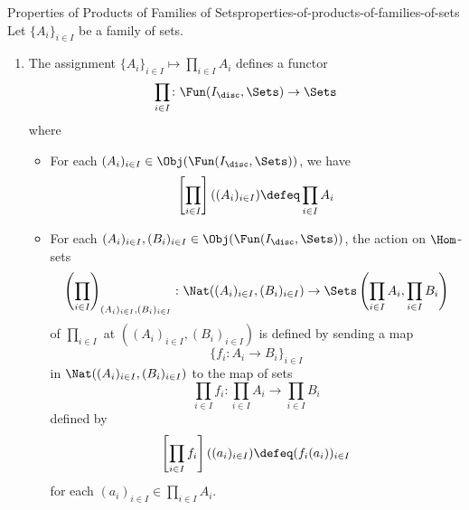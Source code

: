 \begin{proposition}{Properties of Products of Families of Sets}{properties-of-products-of-families-of-sets}%
    Let $\{A_{i}\}_{i\in I}$ be a family of sets.%
    \begin{enumerate}
        \item\label{properties-of-products-of-families-of-sets-functoriality}The assignment $\{A_{i}\}_{i\in I}\mapsto\prod_{i\in I}A_{i}$ defines a functor
            \[
                \prod_{i\in I}%
                \colon%
                \Fun(I_{\disc},\Sets)%
                \to%
                \Sets%
            \]%
            where
            \begin{itemize}
                \item{}For each $(A_{i})_{i\in I}\in\Obj(\Fun(I_{\disc},\Sets))$, we have
                    \[
                        \left[\prod_{i\in I}\right]((A_{i})_{i\in I})%
                        \defeq%
                        \prod_{i\in I}A_{i}%
                    \]%
                \item{}For each $(A_{i})_{i\in I},(B_{i})_{i\in I}\in\Obj(\Fun(I_{\disc},\Sets))$, the action on $\Hom$-sets
                    \[
                        \left(\prod_{i\in I}\right)_{(A_{i})_{i\in I},(B_{i})_{i\in I}}
                        \colon
                        \Nat((A_{i})_{i\in I},(B_{i})_{i\in I})%
                        \to%
                        \Sets\left(\prod_{i\in I}A_{i},\prod_{i\in I}B_{i}\right)%
                    \]%
                    of $\prod_{i\in I}$ at $((A_{i})_{i\in I},(B_{i})_{i\in I})$ is defined by sending a map
                    \[
                        \{%
                            f_{i}%
                            \colon%
                            A_{i}%
                            \to%
                            B_{i}
                        \}_{i\in I}%
                    \]%
                    in $\Nat((A_{i})_{i\in I},(B_{i})_{i\in I})$ to the map of sets
                    \[
                        \prod_{i\in I}f_{i}%
                        \colon
                        \prod_{i\in I}A_{i}%
                        \to%
                        \prod_{i\in I}B_{i}%
                    \]%
                    defined by
                    \[
                        \left[\prod_{i\in I}f_{i}\right]((a_{i})_{i\in I})
                        \defeq%
                        (f_{i}(a_{i}))_{i\in I}
                    \]%
                    for each $(a_{i})_{i\in I}\in\prod_{i\in I}A_{i}$.
            \end{itemize}
    \end{enumerate}
\end{proposition}
